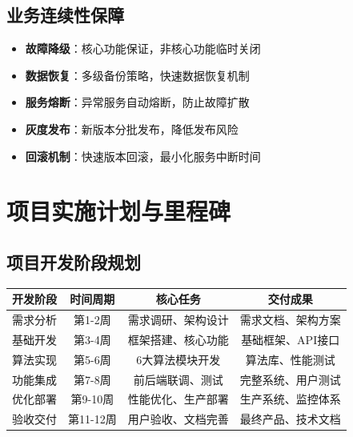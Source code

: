 \documentclass[12pt,a4paper]{article}
\begin{document}
\subsection{业务连续性保障}

\begin{warningbox}[title={业务连续性保障方案}]
\begin{itemize}[nosep]
    \item \textbf{故障降级}：核心功能保证，非核心功能临时关闭
    \item \textbf{数据恢复}：多级备份策略，快速数据恢复机制
    \item \textbf{服务熔断}：异常服务自动熔断，防止故障扩散
    \item \textbf{灰度发布}：新版本分批发布，降低发布风险
    \item \textbf{回滚机制}：快速版本回滚，最小化服务中断时间
\end{itemize}
\end{warningbox}

\section{项目实施计划与里程碑}

\subsection{项目开发阶段规划}

\begin{table}[H]
\centering
\begin{tcolorbox}[
    colback=light,
    colframe=primary,
    title={\textbf{项目实施时间线与关键里程碑}},
    coltitle=white,
    colbacktitle=primary,
    fonttitle=\bfseries,
    rounded corners=5pt,
    width=0.95\textwidth
]
\begin{tabular}{lccc}
\toprule
\rowcolor{primary!20}
\textbf{开发阶段} & \textbf{时间周期} & \textbf{核心任务} & \textbf{交付成果} \\
\midrule
需求分析 & 第1-2周 & 需求调研、架构设计 & 需求文档、架构方案 \\
\rowcolor{light}
基础开发 & 第3-4周 & 框架搭建、核心功能 & 基础框架、API接口 \\
算法实现 & 第5-6周 & 6大算法模块开发 & 算法库、性能测试 \\
\rowcolor{light}
功能集成 & 第7-8周 & 前后端联调、测试 & 完整系统、用户测试 \\
优化部署 & 第9-10周 & 性能优化、生产部署 & 生产系统、监控体系 \\
\rowcolor{light}
验收交付 & 第11-12周 & 用户验收、文档完善 & 最终产品、技术文档 \\
\bottomrule
\end{tabular}
\end{tcolorbox}
\end{table}
\end{document}
